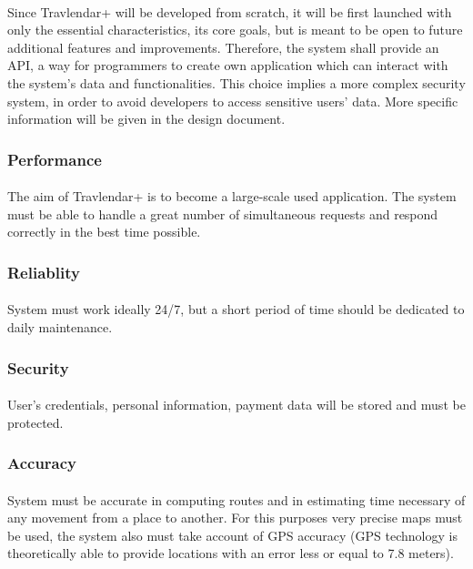 \documentclass{article}
\begin{document}
\paragraph{}
Since Travlendar+ will be developed from scratch, it will be first launched with only the essential characteristics, its core goals, but is meant to be open to future additional features and improvements. Therefore, the system shall provide an API, a way for programmers to create own application which can interact with the system’s data and functionalities. This choice implies a more complex security system, in order to avoid developers to access sensitive users’ data. More specific information will be given in the design document.  
\subsubsection{Performance}
\paragraph{}
The aim of Travlendar+ is to become a large-scale used application. The system must be able to handle a great number of simultaneous requests and respond correctly in the best time possible. 
\subsubsection{Reliablity}
\paragraph{}
System must work ideally 24/7, but a short period of time should be dedicated to daily maintenance.
\subsubsection{Security}
\paragraph{}
User’s credentials, personal information, payment data will be stored and must be protected.
\subsubsection{Accuracy}
\paragraph{}
System must be accurate in computing routes and in estimating time necessary of any movement from a place to another. For this purposes very precise maps must be used, the system also must take account of GPS accuracy (GPS technology is theoretically able to provide locations with an error less or equal to 7.8 meters).
\end{document}
